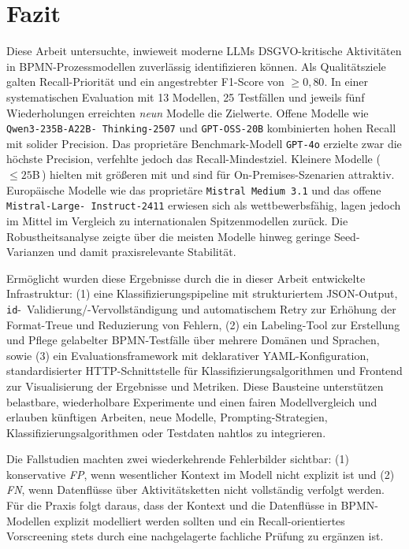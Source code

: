 \chapter{Fazit}\label{ch:fazit}

Diese Arbeit untersuchte, inwieweit moderne \acp{LLM} \ac{DSGVO}-kritische Aktivitäten in \ac{BPMN}-Prozessmodellen zuverlässig identifizieren können. Als Qualitätsziele galten Recall-Priorität und ein angestrebter F1-Score von $\geq 0{,}80$. In einer systematischen Evaluation mit 13 Modellen, 25 Testfällen und jeweils fünf Wiederholungen erreichten \emph{neun} Modelle die Zielwerte. Offene Modelle wie \texttt{Qwen3-235B-A22B-\linebreak~Thinking-2507} und \texttt{GPT-OSS-20B} kombinierten hohen Recall mit solider Precision. Das proprietäre Benchmark-Modell \texttt{GPT-4o} erzielte zwar die höchste Precision, verfehlte jedoch das Recall-Mindestziel. Kleinere Modelle (\,$\leq 25$B\,) hielten mit größeren mit und sind für On-Premises-Szenarien attraktiv. Europäische Modelle wie das proprietäre \texttt{Mistral Medium 3.1} und das offene \texttt{Mistral-Large-\linebreak~Instruct-2411} erwiesen sich als wettbewerbsfähig, lagen jedoch im Mittel im Vergleich zu internationalen Spitzenmodellen zurück. Die Robustheitsanalyse zeigte über die meisten Modelle hinweg geringe Seed-Varianzen und damit praxisrelevante Stabilität.

Ermöglicht wurden diese Ergebnisse durch die in dieser Arbeit entwickelte Infrastruktur: (1) eine Klassifizierungspipeline mit strukturiertem JSON-Output, \texttt{id}-\linebreak~Validierung/-Vervollständigung und automatischem Retry zur Erhöhung der Format-Treue und Reduzierung von Fehlern, (2) ein Labeling-Tool zur Erstellung und Pflege gelabelter \ac{BPMN}-Testfälle über mehrere Domänen und Sprachen, sowie (3) ein Evaluationsframework mit deklarativer YAML-Konfiguration, standardisierter HTTP-Schnittstelle für Klassifizierungsalgorithmen und Frontend zur Visualisierung der Ergebnisse und Metriken. Diese Bausteine unterstützen belastbare, wiederholbare Experimente und einen fairen Modellvergleich und erlauben künftigen Arbeiten, neue Modelle, Prompting-Strategien, Klassifizierungsalgorithmen oder Testdaten nahtlos zu integrieren.

\newpage
Die Fallstudien machten zwei wiederkehrende Fehlerbilder sichtbar: (1) konservative \emph{FP}, wenn wesentlicher Kontext im Modell nicht explizit ist und (2) \emph{FN}, wenn Datenflüsse über Aktivitätsketten nicht vollständig verfolgt werden. Für die Praxis folgt daraus, dass der Kontext und die Datenflüsse in \ac{BPMN}-Modellen explizit modelliert werden sollten und ein Recall-orientiertes Vorscreening stets durch eine nachgelagerte fachliche Prüfung zu ergänzen ist.

